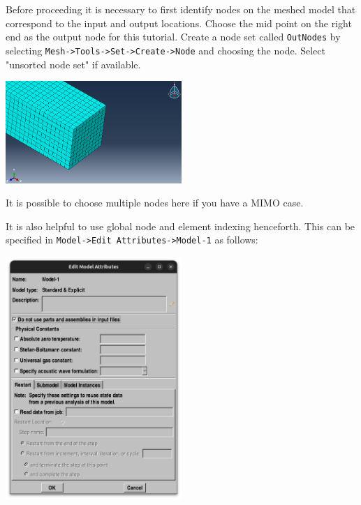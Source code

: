 \documentclass[11pt]{article}
\begin{document}
Before proceeding it is necessary to first identify nodes on the meshed model that correspond to the input and output locations.
Choose the mid point on the right end as the output node for this tutorial.
Create a node set called \texttt{OutNodes} by selecting \texttt{Mesh->Tools->Set->Create->Node} and choosing the node. Select "unsorted node set" if available.
\begin{center}
\includegraphics[width=0.5\textwidth]{./figs/outnode.png}
\end{center}
It is possible to choose multiple nodes here if you have a MIMO case.

It is also helpful to use global node and element indexing henceforth.
This can be specified in \texttt{Model->Edit Attributes->Model-1} as follows:
\begin{center}
\includegraphics[width=0.5\textwidth]{./figs/modl.png}
\end{center}
\end{document}
